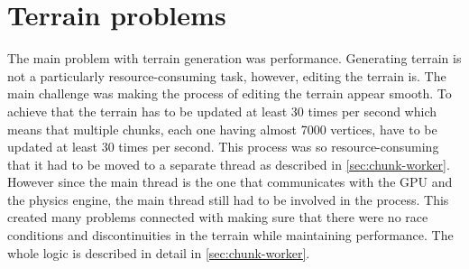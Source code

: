 \section{Terrain problems} \label{sec:terrain_problems}
The main problem with terrain generation was performance.
Generating terrain is not a particularly resource-consuming task, however, editing the terrain is.
The main challenge was making the process of editing the terrain appear smooth.
To achieve that the terrain has to be updated at least 30 times per second which means that multiple chunks, each one having almost 7000 vertices, have to be updated at least 30 times per second.
This process was so resource-consuming that it had to be moved to a separate thread as described in \autoref{sec:chunk-worker}.
However since the main thread is the one that communicates with the GPU and the physics engine, the main thread still had to be involved in the process.
This created many problems connected with making sure that there were no race conditions and discontinuities in the terrain while maintaining performance.
The whole logic is described in detail in \autoref{sec:chunk-worker}.